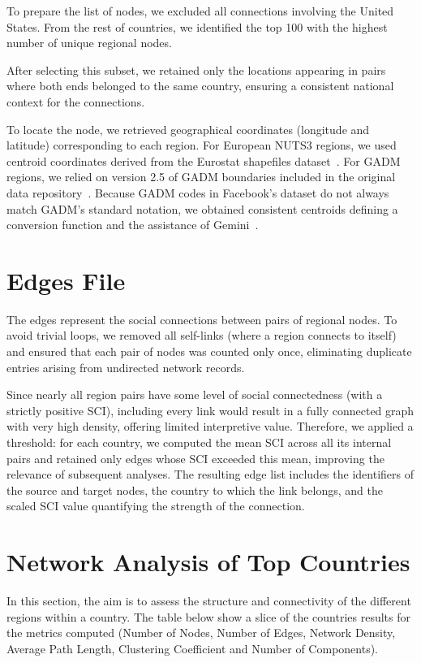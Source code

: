 To prepare the list of nodes, we excluded all connections involving the United States. From the rest of countries, we identified the top 100 with the highest number of unique regional nodes.

After selecting this subset, we retained only the locations appearing in pairs where both ends belonged to the same country, ensuring a consistent national context for the connections. 

To locate the node, we retrieved geographical coordinates (longitude and latitude) corresponding to each region. For European NUTS3 regions, we used centroid coordinates derived from the Eurostat shapefiles dataset~\cite{eurostat2025nuts}. For GADM regions, we relied on version 2.5 of GADM boundaries included in the original data repository~\cite{facebook2025sci}. Because GADM codes in Facebook’s dataset do not always match GADM’s standard notation, we obtained consistent centroids defining a conversion function and the assistance of Gemini~\cite{google2025gemini}. 

\section{Edges File}

The edges represent the social connections between pairs of regional nodes. To avoid trivial loops, we removed all self-links (where a region connects to itself) and ensured that each pair of nodes was counted only once, eliminating duplicate entries arising from undirected network records.

Since nearly all region pairs have some level of social connectedness (with a strictly positive SCI), including every link would result in a fully connected graph with very high density, offering limited interpretive value. Therefore, we applied a threshold: for each country, we computed the mean SCI across all its internal pairs and retained only edges whose SCI exceeded this mean, improving the relevance of subsequent analyses. The resulting edge list includes the identifiers of the source and target nodes, the country to which the link belongs, and the scaled SCI value quantifying the strength of the connection.


\section{Network Analysis of Top Countries}

In this section, the aim is to assess the structure and connectivity of the different regions within a country. The table below show a slice of the countries results for the metrics computed (Number of Nodes, Number of Edges, Network Density, Average Path Length, Clustering Coefficient and Number of Components).




